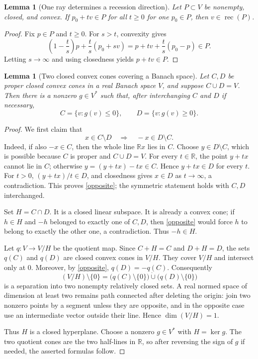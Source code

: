 \documentclass[11pt]{article}
\newtheorem{lemma}[theorem]{Lemma}
\theoremstyle{remark}
\newcommand{\rec}{\operatorname{rec}}
\newcommand{\R}{\mathbb{R}}
\begin{document}
\begin{lemma}[One ray determines a recession direction]
\label{lem:ray}
Let $P\subset V$ be nonempty, closed, and convex.  If $p_0+tv\in P$ for all
$t\geq0$ for one $p_0\in P$, then $v\in\rec(P)$.
\end{lemma}

\begin{proof}
Fix $p\in P$ and $t\geq0$.  For $s>t$, convexity gives
\[
 \left(1-\frac ts\right)p+\frac ts(p_0+sv)
 =p+tv+\frac ts(p_0-p)\in P.
\]
Letting $s\to\infty$ and using closedness yields $p+tv\in P$.
\end{proof}

\begin{lemma}[Two closed convex cones covering a Banach space]
\label{lem:cones}
Let $C,D$ be proper closed convex cones in a real Banach space $V$, and
suppose $C\cup D=V$.  Then there is a nonzero $g\in V^*$ such that, after
interchanging $C$ and $D$ if necessary,
\[
 C=\{v:g(v)\leq0\},\qquad D=\{v:g(v)\geq0\}.
\]
\end{lemma}

\begin{proof}
We first claim that
\[
\tag{5.1}\label{opposite}
 x\in C\setminus D\quad\Longrightarrow\quad -x\in D\setminus C.
\]
Indeed, if also $-x\in C$, then the whole line $\R x$ lies in $C$.  Choose
$y\in D\setminus C$, which is possible because $C$ is proper and
$C\cup D=V$.  For every $t\in\R$, the point $y+tx$ cannot lie in $C$;
otherwise $y=(y+tx)-tx\in C$.  Hence $y+tx\in D$ for every $t$.  For
$t>0$, $(y+tx)/t\in D$, and closedness gives $x\in D$ as $t\to\infty$, a
contradiction.  This proves \eqref{opposite}; the symmetric statement holds
with $C,D$ interchanged.

Set $H=C\cap D$.  It is a closed linear subspace.  It is already a convex
cone; if $h\in H$ and $-h$ belonged to exactly one of $C,D$, then
\eqref{opposite} would force $h$ to belong to exactly the other one, a
contradiction.  Thus $-h\in H$.

Let $q:V\to V/H$ be the quotient map.  Since $C+H=C$ and $D+H=D$, the sets
$q(C)$ and $q(D)$ are closed convex cones in $V/H$.  They cover $V/H$ and
intersect only at $0$.  Moreover, by \eqref{opposite},
$q(D)=-q(C)$.  Consequently
\[
 (V/H)\setminus\{0\}
 =\bigl(q(C)\setminus\{0\}\bigr)
  \mathbin{\dot\cup}
  \bigl(q(D)\setminus\{0\}\bigr)
\]
is a separation into two nonempty relatively closed sets.  A real normed
space of dimension at least two remains path connected after deleting the
origin: join two nonzero points by a segment unless they are opposite, and
in the opposite case use an intermediate vector outside their line.  Hence
$\dim(V/H)=1$.

Thus $H$ is a closed hyperplane.  Choose a nonzero $g\in V^*$ with
$H=\ker g$.  The two quotient cones are the two half-lines in $\R$, so after
reversing the sign of $g$ if needed, the asserted formulas follow.
\end{proof}
\end{document}
